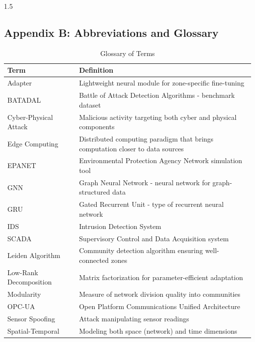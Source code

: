 \begin{spacing}{1.5}
\subsection{Appendix B: Abbreviations and Glossary}

\begin{table}[htbp]
\centering
\begin{tabularx}{\textwidth}{|l|X|}
\hline
\textbf{Term} & \textbf{Definition} \\
\hline
Adapter & Lightweight neural module for zone-specific fine-tuning \\
\hline
BATADAL & Battle of Attack Detection Algorithms - benchmark dataset \\
\hline
Cyber-Physical Attack & Malicious activity targeting both cyber and physical components \\
\hline
Edge Computing & Distributed computing paradigm that brings computation closer to data sources \\
\hline
EPANET & Environmental Protection Agency Network simulation tool \\
\hline
GNN & Graph Neural Network - neural network for graph-structured data \\
\hline
GRU & Gated Recurrent Unit - type of recurrent neural network \\
\hline
IDS & Intrusion Detection System \\
\hline
SCADA & Supervisory Control and Data Acquisition system \\
\hline

Leiden Algorithm & Community detection algorithm ensuring well-connected zones \\
\hline
Low-Rank Decomposition & Matrix factorization for parameter-efficient adaptation \\
\hline
Modularity & Measure of network division quality into communities \\
\hline
OPC-UA & Open Platform Communications Unified Architecture \\
\hline
Sensor Spoofing & Attack manipulating sensor readings \\
\hline
Spatial-Temporal & Modeling both space (network) and time dimensions \\
\hline
\end{tabularx}
\caption{Glossary of Terms}
\end{table}


\end{spacing}
